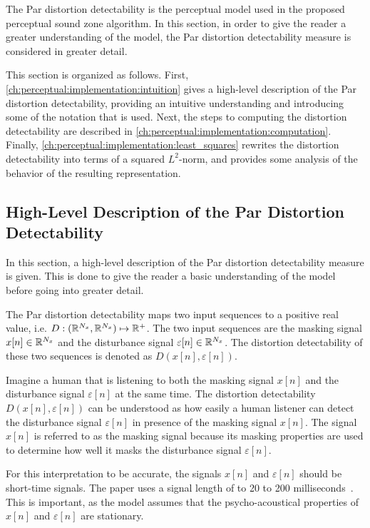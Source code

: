 The Par distortion detectability is the perceptual model used in the proposed perceptual sound zone algorithm.
In this section, in order to give the reader a greater understanding of the model, 
the Par distortion detectability measure is considered in greater detail.

This section is organized as follows.
First, \autoref{ch:perceptual:implementation:intuition} gives a high-level description of the 
Par distortion detectability, providing an intuitive understanding and introducing some of the notation that is used.
Next, the steps to computing the distortion detectability are described in 
\autoref{ch:perceptual:implementation:computation}.
Finally, \autoref{ch:perceptual:implementation:least_squares} rewrites the distortion detectability into terms of a 
squared $L^2$-norm, and provides some analysis of the behavior of the resulting representation.

\subsection{High-Level Description of the Par Distortion Detectability}
\label{ch:perceptual:implementation:intuition}
In this section, a high-level description of the Par distortion detectability measure is given.
This is done to give the reader a basic understanding of the model before going into greater detail.

The Par distortion detectability maps two input sequences to a positive real value, 
i.e. $D: (\mathbb{R}^{N_x}, \mathbb{R}^{N_x})\mapsto \mathbb{R}^{+}$.
The two input sequences are the masking signal $x[n]\in\mathbb{R}^{N_x}$ and the disturbance signal $\varepsilon[n]\in\mathbb{R}^{N_x}$.
The distortion detectability of these two sequences is denoted as $D(x[n], \varepsilon[n])$. 

Imagine a human that is listening to both the masking signal $x[n]$ and the disturbance signal $\varepsilon[n]$ 
at the same time.
The distortion detectability $D(x[n], \varepsilon[n])$ can be understood as how easily a human listener can 
detect the disturbance signal $\varepsilon[n]$ in presence of the masking signal $x[n]$.
The signal $x[n]$ is referred to as the masking signal because its masking properties are used to 
determine how well it masks the disturbance signal $\varepsilon[n]$.

For this interpretation to be accurate, the signals $x[n]$ and $\varepsilon[n]$ should be short-time signals.
The paper uses a signal length of to 20 to 200 milliseconds~\cite{van2005perceptual}.    
This is important, as the model assumes that the psycho-acoustical properties of $x[n]$ 
and $\varepsilon[n]$ are stationary.  

